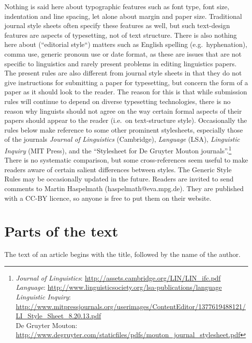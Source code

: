 \documentclass[a4paper]{article}
\begin{document}
Nothing is said here about typographic features such as font type, font
size, indentation and line spacing, let alone about margin and paper
size. Traditional journal style sheets often specify these features as
well, but such text-design features are aspects of typesetting, not of
text structure. There is also nothing here about (``editorial style``)
matters such as English spelling (e.g.~hyphenation), comma use, generic
pronoun use or date format, as these are issues that are not specific to
linguistics and rarely present problems in editing linguistics papers.
The present rules are also different from journal style sheets in that
they do not give instructions for submitting a paper for typesetting,
but concern the form of a paper as it should look to the reader. The
reason for this is that while submission rules will continue to depend
on diverse typesetting technologies, there is no reason why linguists
should not agree on the way certain formal aspects of their papers
should appear to the reader (i.e.~on text-structure style). Occasionally
the rules below make reference to some other prominent stylesheets,
especially those of the journals 
\textit{Journal of Linguistics} (Cambridge),
\textit{Language} (LSA), 
\textit{Linguistic Inquiry} (MIT Press), and the
``Stylesheet for De Gruyter Mouton journals''.\footnote{%
  \textit{Journal of Linguistics}:
    \url{http://assets.cambridge.org/LIN/LIN_ifc.pdf} \\
  \textit{Language}:
    \url{http://www.linguisticsociety.org/lsa-publications/language}\\
  \textit{Linguistic Inquiry}:
    \url{http://www.mitpressjournals.org/userimages/ContentEditor/1377619488121/LI_Style_Sheet_8.20.13.pdf}\\
  {De Gruyter Mouton}:
    \url{http://www.degruyter.com/staticfiles/pdfs/mouton_journal_stylesheet.pdf}
} 
There is no systematic comparison, but some cross-references seem
useful to make readers aware of certain salient differences between
styles. The Generic Style Rules may be occasionally updated in the
future. Readers are invited to send comments to Martin Haspelmath
(haspelmath@eva.mpg.de). They are published with a CC-BY licence, so
anyone is free to put them on their website.

\section{Parts of the text}\label{sec:parts}

The text of an article begins with the title, followed by the name of
the author. 
\end{document}
